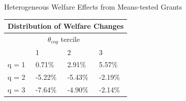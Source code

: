 \documentclass{beamer}
\begin{document}

\begin{frame}{Heterogeneous Welfare Effects from Means-tested Grants}

\begin{table}[]
\centering
\label{my-label}
\begin{tabular}{llll}
\multicolumn{4}{c}{Distribution of Welfare Changes}                                                                      \\ \hline
\multicolumn{1}{|l|}{}      & \multicolumn{2}{c}{$\theta_{cog}$ tercile}                 & \multicolumn{1}{l|}{}        \\ \hline
\multicolumn{1}{|l|}{}      & \multicolumn{1}{l|}{1}       & \multicolumn{1}{l|}{2}       & \multicolumn{1}{l|}{3}       \\ \hline
\multicolumn{1}{|l|}{q = 1} & \multicolumn{1}{l|}{0.71\%}  & \multicolumn{1}{l|}{2.91\%}  & \multicolumn{1}{l|}{5.57\%}  \\ \hline
\multicolumn{1}{|l|}{q = 2} & \multicolumn{1}{l|}{-5.22\%} & \multicolumn{1}{l|}{-5.43\%} & \multicolumn{1}{l|}{-2.19\%} \\ \hline
\multicolumn{1}{|l|}{q = 3} & \multicolumn{1}{l|}{-7.64\%} & \multicolumn{1}{l|}{-4.90\%} & \multicolumn{1}{l|}{-2.14\%} \\ \hline
\end{tabular}
\end{table}

\end{frame}
\end{document}

